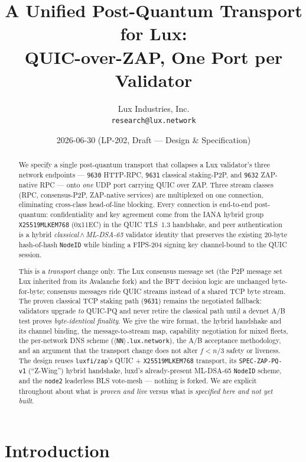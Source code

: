 \documentclass[11pt,a4paper]{article}
\title{A Unified Post-Quantum Transport for Lux:\\
       QUIC-over-ZAP, One Port per Validator}
\author{Lux Industries, Inc. \\
        \texttt{research@lux.network}}
\date{2026-06-30 \quad (LP-202, Draft --- Design \& Specification)}
\newcommand{\code}[1]{\texttt{#1}}
\begin{document}
\luxcoverpage

\begin{abstract}
We specify a single post-quantum transport that collapses a Lux
validator's three network endpoints --- \code{9630} HTTP-RPC,
\code{9631} classical staking-P2P, and \code{9632} ZAP-native RPC ---
onto \emph{one} UDP port carrying QUIC over ZAP. Three stream classes
(RPC, consensus-P2P, ZAP-native services) are multiplexed on one
connection, eliminating cross-class head-of-line blocking. Every
connection is end-to-end post-quantum: confidentiality and key
agreement come from the IANA hybrid group \code{X25519MLKEM768}
(0x11EC) in the QUIC TLS~1.3 handshake, and peer authentication is a
hybrid \emph{classical\,$\wedge$\,ML-DSA-65} validator identity that
preserves the existing 20-byte hash-of-hash \code{NodeID} while binding
a FIPS-204 signing key channel-bound to the QUIC session.

This is a \emph{transport} change only. The Lux consensus message set
(the P2P message set Lux inherited from its Avalanche fork) and the BFT
decision logic are unchanged byte-for-byte; consensus messages ride QUIC
streams instead of a shared TCP byte stream. The
proven classical TCP staking path (\code{9631}) remains the negotiated
fallback: validators upgrade \emph{to} QUIC-PQ and never retire the
classical path until a devnet A/B test proves \emph{byte-identical
finality}. We give the wire format, the hybrid handshake and its
channel binding, the message-to-stream map, capability negotiation for
mixed fleets, the per-network DNS scheme
(\code{$\langle$NN$\rangle$.lux.network}), the A/B acceptance
methodology, and an argument that the transport change does not alter
$f<n/3$ safety or liveness. The design reuses \code{luxfi/zap}'s
QUIC + \code{X25519MLKEM768} transport, its \code{SPEC-ZAP-PQ-v1}
(``Z-Wing'') hybrid handshake, luxd's already-present ML-DSA-65
\code{NodeID} scheme, and the \code{node2} leaderless BLS vote-mesh ---
nothing is forked. We are explicit throughout about what is
\emph{proven and live} versus what is \emph{specified here and not yet
built}.
\end{abstract}

\tableofcontents
\newpage

\section{Introduction}\label{sec:intro}
\end{document}
